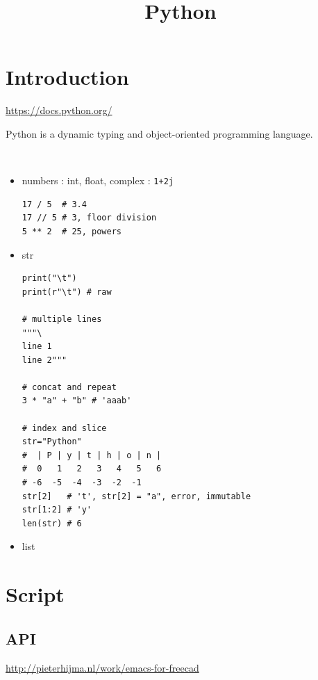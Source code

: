 \documentclass{blog}
\title{Python}
\begin{document}
\maketitle
\tableofcontents
\section{Introduction}
\url{https://docs.python.org/}

\begin{definition}[python]
    Python is a dynamic typing and object-oriented programming language.
\end{definition}

\begin{definition}[types]~
    \begin{itemize}
        \item numbers : int, float, complex : \verb|1+2j|
              \begin{verbatim}
17 / 5  # 3.4
17 // 5 # 3, floor division
5 ** 2  # 25, powers
\end{verbatim}
        \item str
              \begin{verbatim}
print("\t")
print(r"\t") # raw

# multiple lines
"""\
line 1
line 2"""

# concat and repeat
3 * "a" + "b" # 'aaab'

# index and slice
str="Python"
#  | P | y | t | h | o | n |
#  0   1   2   3   4   5   6
# -6  -5  -4  -3  -2  -1
str[2]   # 't', str[2] = "a", error, immutable
str[1:2] # 'y'
len(str) # 6
\end{verbatim}
        \item list
    \end{itemize}
\end{definition}

\appendix
\section{Script}
\subsection{API}
\url{http://pieterhijma.nl/work/emacs-for-freecad}

\printbibliography
\end{document}
